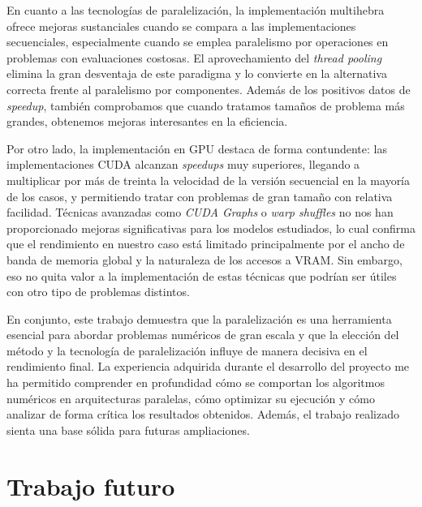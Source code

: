 En cuanto a las tecnologías de paralelización, la implementación multihebra ofrece mejoras sustanciales cuando se compara a las implementaciones secuenciales, especialmente cuando se emplea paralelismo por operaciones en problemas con evaluaciones costosas. El aprovechamiento del \textit{thread pooling} elimina la gran desventaja de este paradigma y lo convierte en la alternativa correcta frente al paralelismo por componentes. Además de los positivos datos de \textit{speedup}, también comprobamos que cuando tratamos tamaños de problema más grandes, obtenemos mejoras interesantes en la eficiencia.

Por otro lado, la implementación en GPU destaca de forma contundente: las implementaciones CUDA alcanzan \textit{speedups} muy superiores, llegando a multiplicar por más de treinta la velocidad de la versión secuencial en la mayoría de los casos, y permitiendo tratar con problemas de gran tamaño con relativa facilidad. Técnicas avanzadas como \textit{CUDA Graphs} o \textit{warp shuffles} no nos han proporcionado mejoras significativas para los modelos estudiados, lo cual confirma que el rendimiento en nuestro caso está limitado principalmente por el ancho de banda de memoria global y la naturaleza de los accesos a VRAM. Sin embargo, eso no quita valor a la implementación de estas técnicas que podrían ser útiles con otro tipo de problemas distintos.

En conjunto, este trabajo demuestra que la paralelización es una herramienta esencial para abordar problemas numéricos de gran escala y que la elección del método y la tecnología de paralelización influye de manera decisiva en el rendimiento final. La experiencia adquirida durante el desarrollo del proyecto me ha permitido comprender en profundidad cómo se comportan los algoritmos numéricos en arquitecturas paralelas, cómo optimizar su ejecución y cómo analizar de forma crítica los resultados obtenidos. Además, el trabajo realizado sienta una base sólida para futuras ampliaciones.

\section{Trabajo futuro}

